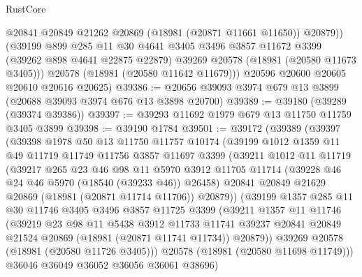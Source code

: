 \begin{lexlean}{RustCore}
\begin{coremodule}
            @20841
            @20849
            @21262
            @20869
            (@18981 (@20871 @11661 @11650))
            @20879))
        (@39199
          @899
          @285
          @11
          @30
          @4641
          @3405
          @3496
          @3857
          @11672
          @3399
          (@39262 @898 @4641 @22875 @22879)
          @39269
          @20578
          (@18981 (@20580 @11673 @3405)))
        @20578
        (@18981 (@20580 @11642 @11679)))
      @20596
      @20600
      @20605
      @20610
      @20616
      @20625)
@39386 := @20656 @39093 @3974 @679 @13 @3899 (@20688 @39093 @3974 @676 @13 @3898 @20700)
@39389 := @39180 (@39289 (@39374 @39386))
@39397 := @39293 @11692 @1979 @679 @13 @11750 @11759 @3405 @3899
@39398 := @39190 @1784
@39501 := @39172
    (@39389
      (@39397
        (@39398
          @1978
          @50
          @13
          @11750
          @11757
          @10174
          (@39199
            @1012
            @1359
            @11
            @49
            @11719
            @11749
            @11756
            @3857
            @11697
            @3399
            (@39211
              @1012
              @11
              @11719
              (@39217
                @265
                @23
                @46
                @98
                @11
                @5970
                @3912
                @11705
                @11714
                (@39228 @46 @24 @46 @5970 (@18540 (@39233 @46)) @26458)
                @20841
                @20849
                @21629
                @20869
                (@18981 (@20871 @11714 @11706))
                @20879))
            (@39199
              @1357
              @285
              @11
              @30
              @11746
              @3405
              @3496
              @3857
              @11725
              @3399
              (@39211
                @1357
                @11
                @11746
                (@39219
                  @23
                  @98
                  @11
                  @5438
                  @3912
                  @11733
                  @11741
                  @39237
                  @20841
                  @20849
                  @21524
                  @20869
                  (@18981 (@20871 @11741 @11734))
                  @20879))
              @39269
              @20578
              (@18981 (@20580 @11726 @3405)))
            @20578
            (@18981 (@20580 @11698 @11749)))
          @36046
          @36049
          @36052
          @36056
          @36061
          @38696)

\end{coremodule}
\end{lexlean}
